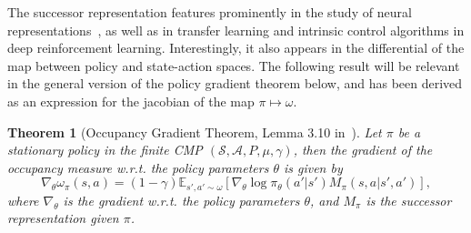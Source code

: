 \documentclass{article}
\theoremstyle{plain}
\newtheorem{theorem}{Theorem}[section]
\theoremstyle{definition}
\theoremstyle{remark}
\newcommand{\sS}{\mathcal{S}}
\newcommand{\sA}{\mathcal{A}}
\begin{document}
The successor representation features prominently in the study of neural representations~\cite{gershman2018successor}, as well as in transfer learning \citep{barreto2017successor} and intrinsic control algorithms \citep{hansen2019fast} in deep reinforcement learning.
Interestingly, it also appears in the differential of the map between policy and state-action spaces. 
The following result will be relevant in the general version of the policy gradient theorem below, and has been derived as an expression for the jacobian of the map $\pi\mapsto\omega$.

\begin{theorem}[Occupancy Gradient Theorem, Lemma 3.10 in~\citep{muller2024geometry}]
    Let $\pi$ be a stationary policy in the finite CMP $(\sS,\sA,P,\mu,\gamma)$, then the gradient of the occupancy measure w.r.t. the policy parameters $\theta$ is given by
    \begin{equation}\label{eq:occupancy-gradient}
    \nabla_\theta \omega_\pi(s,a) = (1-\gamma)\mathbb{E}_{s',a' \sim \omega} \left[ \nabla_\theta \log\pi_\theta(a'|s')M_\pi(s,a|s',a')\right],
    \end{equation}
    where $\nabla_\theta$ is the gradient w.r.t. the policy parameters $\theta$, and $M_\pi$ is the successor representation given $\pi$.
\end{theorem}
\end{document}
